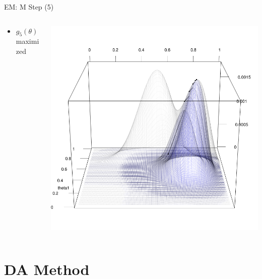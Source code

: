 \documentclass[dvipdfmx,bigger,aspectratio=169]{beamer}
\begin{document}
\begin{frame}[label={sec:orgc761e16}]{EM: M Step (5)}
\begin{columns}
\begin{column}{0.50\columnwidth}
\begin{itemize}
\item \(g_{5}(\theta)\) maximized
\end{itemize}
\end{column}
\begin{column}{0.50\columnwidth}
\begin{center}
\includegraphics[page=1,keepaspectratio,width=\textwidth,height=\textheight]{./source/em_rgl_g5_m.png}
\end{center}
\end{column}
\end{columns}
\end{frame}

\section{DA Method}
\label{sec:org536f30f}
\appendix
\begin{frame}[label={sec:org48f9767}]{}
\begin{center}
\end{center}
\end{frame}
\end{document}
